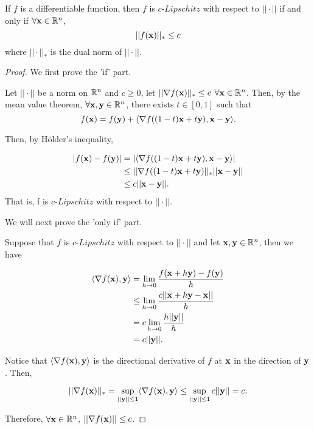 \documentclass[../main.tex]{subfiles}
\begin{document}
\begin{claim}
	If $f$ is a differentiable function, then $f$ is $c$-$Lipschitz$ with respect to $||\cdot||$ if and only if $\forall \mathbf{x} \in \mathbb{R}^n$,
		\begin{equation}
	||f(\mathbf{x})||_* \leq c
	\end{equation}
	where $||\cdot||_*$ is the dual norm of $||\cdot||$.
\end{claim}
\begin{proof}
	We first prove the 'if' part.
	
	Let $||\cdot||$ be a norm on $\mathbb{R}^n$ and $c \geq 0$, let $||\nabla f(\mathbf{x})||_* \leq c $ $\forall \mathbf{x} \in \mathbb{R}^n$. Then, by the mean value theorem, $\forall \mathbf{x}, \mathbf{y} \in\mathbb{R}^n$, there exists $t\in [0,1]$ such that 
	\begin{equation*}
		f(\mathbf{x}) = f(\mathbf{y}) + \langle \nabla f((1-t) \mathbf{x} + t \mathbf{y}) , \mathbf{x} - \mathbf{y} \rangle.
	\end{equation*}
	
	Then, by H\"older's inequality, 
	
	\begin{equation*}
		\begin{aligned}
				|f(\mathbf{x}) - f(\mathbf{y})| & = |\langle \nabla f((1-t) \mathbf{x} + t \mathbf{y}) , \mathbf{x} - \mathbf{y} \rangle| \\
								  & \leq ||\nabla f((1-t) \mathbf{x} + t \mathbf{y})||_* ||\mathbf{x} - \mathbf{y}|| \\
								  & \leq c ||\mathbf{x} - \mathbf{y}||.
		\end{aligned}
	\end{equation*}
	That is, f is $c$-$Lipschitz$ with respect to $||\cdot||$.
	
	We will next prove the 'only if' part.
	
	Suppose that $f$ is $c$-$Lipschitz$ with respect to $||\cdot||$ and let $\mathbf{x}, \mathbf{y} \in \mathbb{R}^n$, then we have 
	
	\begin{equation*}
		\begin{aligned}
			\langle \nabla f(\mathbf{x}) , \mathbf{y} \rangle &= \lim\limits_{h \to 0} \frac{f(\mathbf{x} + h\mathbf{y}) - f(\mathbf{y})}{h} \\
												&\leq \lim\limits_{h \to 0} \frac{c||\mathbf{x} + h\mathbf{y} - \mathbf{x}||}{h} \\
												& = c \lim\limits_{h \to 0} \frac{h||\mathbf{y}||}{h} \\
												& = c||\mathbf{y}||.
		\end{aligned}
	\end{equation*}
	
	Notice that $\langle \nabla f(\mathbf{x}) , \mathbf{y} \rangle$ is the directional derivative of $f$ at $\mathbf{x}$ in the direction of $\mathbf{y}$. Then,
	
	\begin{equation*}
		||\nabla f(\mathbf{x})||_* = \sup\limits_{||\mathbf{y}||\leq 1} \langle \nabla f(\mathbf{x}) , \mathbf{y} \rangle \leq \sup\limits_{||\mathbf{y}||\leq 1}  c||\mathbf{y}|| = c.
	\end{equation*}
	
	Therefore, $\forall \mathbf{x} \in \mathbb{R}^n$, $||\nabla f(\mathbf{x})|| \leq c$.
\end{proof}
\end{document}
